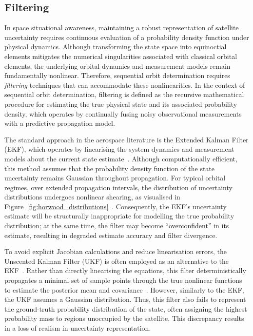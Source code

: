 \subsection{Filtering} \label{subsec:filtering}

In space situational awareness, maintaining a robust representation of satellite uncertainty requires continuous evaluation of a probability density function under physical dynamics. Although transforming the state space into equinoctial elements mitigates the numerical singularities associated with classical orbital elements, the underlying orbital dynamics and measurement models remain fundamentally nonlinear. Therefore, sequential orbit determination requires \emph{filtering} techniques that can accommodate these nonlinearities. In the context of sequential orbit determination, filtering is defined as the recursive mathematical procedure for estimating the true physical state and its associated probability density, which operates by continually fusing noisy observational measurements with a predictive propagation model.

The standard approach in the aerospace literature is the Extended Kalman Filter (EKF), which operates by linearising the system dynamics and measurement models about the current state estimate~\cite{Horwood2014}. Although computationally efficient, this method assumes that the probability density function of the state uncertainty remains Gaussian throughout propagation. For typical orbital regimes, over extended propagation intervals, the distribution of uncertainty distributions undergoes nonlinear shearing, as visualised in Figure~\ref{fig:horwood_distributions}~\cite{Horwood2014}. Consequently, the EKF's uncertainty estimate will be structurally inappropriate for modelling the true probability distribution; at the same time, the filter may become ``overconfident'' in its estimate, resulting in degraded estimate accuracy and filter divergence.

To avoid explicit Jacobian calculations and reduce linearisation errors, the Unscented Kalman Filter (UKF) is often employed as an alternative to the EKF~\cite{Horwood2014}. Rather than directly linearising the equations, this filter deterministically propagates a minimal set of sample points through the true nonlinear functions to estimate the posterior mean and covariance~\cite{Horwood2014}. However, similarly to the EKF, the UKF assumes a Gaussian distribution. Thus, this filter also fails to represent the ground-truth probability distribution of the state, often assigning the highest probability mass to regions unoccupied by the satellite. This discrepancy results in a loss of realism in uncertainty representation.

